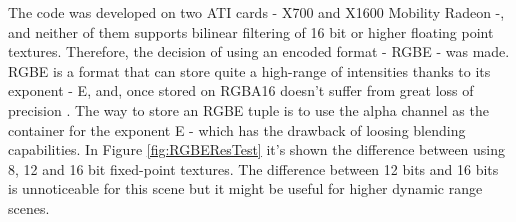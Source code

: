 \documentclass[twocolumn,8pt]{article}
\begin{document}
The code was developed on two ATI cards - X700 and X1600 Mobility Radeon -, and neither of them supports bilinear filtering of 16 bit or higher floating point textures. Therefore, the decision of using an encoded format - RGBE - was made. RGBE is a format that can store quite a high-range of intensities thanks to its exponent - E, and, once stored on RGBA16 doesn't suffer from great loss of precision \cite{hdrTexturing}. The way to store an RGBE tuple is to use the alpha channel as the container for the exponent E - which has the drawback of loosing blending capabilities.
In Figure \ref{fig:RGBEResTest} it's shown the difference between using 8, 12 and 16 bit fixed-point textures. The difference between 12 bits and 16 bits is unnoticeable for this scene but it might be useful for higher dynamic range scenes.

\begin{figure}[t]
\centering
{} 

\end{figure}
\end{document}
